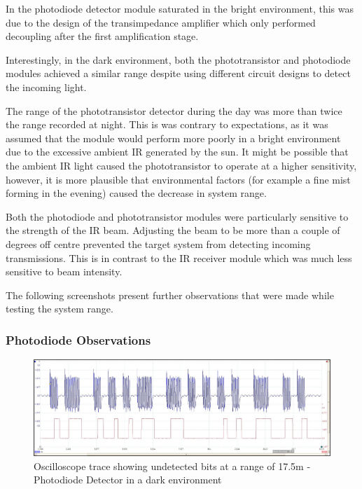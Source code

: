 In the photodiode detector module saturated in the bright environment, this was due to the design of the transimpedance amplifier which only performed decoupling after the first amplification stage.

Interestingly, in the dark environment, both the phototransistor and photodiode modules achieved a similar range despite using different circuit designs to detect the incoming light.

The range of the phototransistor detector during the day was more than twice the range recorded at night. This is was contrary to expectations, as it was assumed that the module would perform more poorly in a bright environment due to the excessive ambient IR generated by the sun.
It might be possible that the ambient IR light caused the phototransistor to operate at a higher sensitivity, however, it is more plausible that environmental factors (for example a fine mist forming in the evening) caused the decrease in system range.

Both the photodiode and phototransistor modules were particularly sensitive to the strength of the IR beam. Adjusting the beam to be more than a couple of degrees off centre prevented the target system from detecting incoming transmissions. This is in contrast to the IR receiver module which was much less sensitive to beam intensity.

The following screenshots present further observations that were made while testing the system range. %


\subsubsection{Photodiode Observations}
\begin{figure}[H]
	\centering
	\includegraphics[width=.9\textwidth]{figures/results/drak_system_test/photodiode1750cm_missed_bits.jpg}
	\caption{Oscilloscope trace showing undetected bits at a range of 17.5m - Photodiode Detector in a dark environment}
	\label{fig:photodiode_bit_error}
\end{figure}


